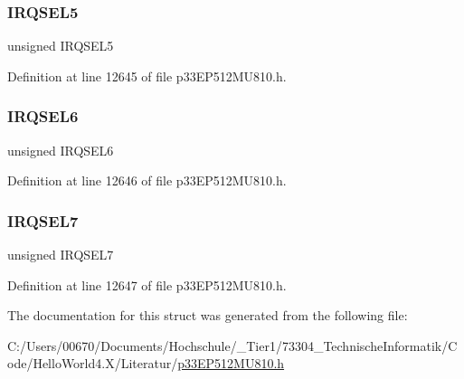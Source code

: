 \subsubsection{\texorpdfstring{I\+R\+Q\+S\+E\+L5}{IRQSEL5}}
{\footnotesize\ttfamily unsigned I\+R\+Q\+S\+E\+L5}



Definition at line 12645 of file p33\+E\+P512\+M\+U810.\+h.

\mbox{\label{structtag_d_m_a0_r_e_q_b_i_t_s_ace52408ef8c29561f3c56a3fbcbc8217}} 
\subsubsection{\texorpdfstring{I\+R\+Q\+S\+E\+L6}{IRQSEL6}}
{\footnotesize\ttfamily unsigned I\+R\+Q\+S\+E\+L6}



Definition at line 12646 of file p33\+E\+P512\+M\+U810.\+h.

\mbox{\label{structtag_d_m_a0_r_e_q_b_i_t_s_acce7dedecdf1f53cdbead3edf7c5d53a}} 
\subsubsection{\texorpdfstring{I\+R\+Q\+S\+E\+L7}{IRQSEL7}}
{\footnotesize\ttfamily unsigned I\+R\+Q\+S\+E\+L7}



Definition at line 12647 of file p33\+E\+P512\+M\+U810.\+h.



The documentation for this struct was generated from the following file\+:\begin{DoxyCompactItemize}
\item 
C\+:/\+Users/00670/\+Documents/\+Hochschule/\+\_\+\+Tier1/73304\+\_\+\+Technische\+Informatik/\+Code/\+Hello\+World4.\+X/\+Literatur/\hyperlink{p33_e_p512_m_u810_8h}{p33\+E\+P512\+M\+U810.\+h}\end{DoxyCompactItemize}
